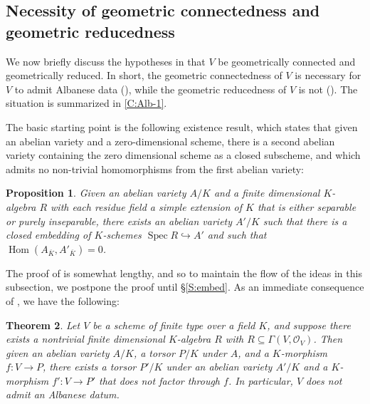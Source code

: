 \documentclass[11pt, reqno]{amsart}
\numberwithin{equation}{section}
\newtheorem{teo}{Theorem}[section]
\newtheorem{pro}[teo]{Proposition}
\theoremstyle{definition}
\theoremstyle{remark}
\DeclareMathOperator{\hom}{Hom}
\renewcommand{\bar}[1]{{\overline{#1}}}
\DeclareMathOperator{\spec}{Spec}
\begin{document}
   
 \subsection{Necessity of geometric connectedness and geometric reducedness}
 
        
We now briefly discuss the hypotheses in  that $V$
be geometrically connected and geometrically reduced.  In short, the
geometric connectedness of $V$ is necessary for $V$ to admit 
Albanese data (), while the
geometric reducedness of $V$ is not (). 
  The situation is summarized in \ref{C:Alb-1}.

 

\medskip 
The basic starting point is the following existence result, which states that given an abelian variety and a zero-dimensional scheme, there is a second abelian variety containing the zero dimensional scheme as a closed subscheme, and  which admits no non-trivial homomorphisms from the first abelian variety:


\begin{pro}
\label{P:embed} 
 Given an abelian variety $A/K$ and a finite dimensional $K$-algebra $R$ with each residue field a simple extension of $K$ that is either separable or purely inseparable,  there exists an abelian variety $A'/K$ such that there is a closed embedding of $K$-schemes  $\spec R \hookrightarrow A'$ and such that $\hom(A_{\bar K}, A'_{\bar K}) = 0$.
\end{pro}

The proof of   is somewhat lengthy, and so to maintain the flow of the ideas in this subsection,  we postpone the proof until \S \ref{S:embed}.  As an immediate consequence of  , we have the following:

\begin{teo}
  \label{C:integral} 
  Let $V$ be a scheme of finite type over a field $K$, and suppose there exists 
  a nontrivial finite dimensional $K$-algebra $R$ with $R\subseteq \Gamma(V, \mathcal O_V)$. 
  Then given an  abelian variety $A/K$,  a torsor $P/K$  under
$A$, and a $K$-morphism $f:V \to P$, there exists a torsor $P'/K$ under an abelian
variety $A'/K$ and a $K$-morphism $f':V \to P'$ that does not factor through
$f$.  In particular, $V$ does not admit an Albanese datum.
\end{teo}
\end{document}
